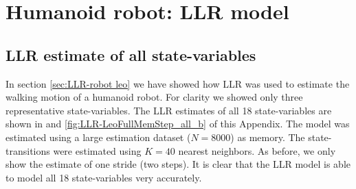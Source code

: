 \chapter{Humanoid robot: LLR model}\label{app:LeoWalking}

\section{LLR estimate of all state-variables}

In section \ref{sec:LLR-robot leo} we have showed how \ac{LLR} was used to estimate the walking motion of a humanoid robot. For clarity we showed only three representative state-variables. The \ac{LLR} estimates of all 18 state-variables are shown in  and \ref {fig:LLR-LeoFullMemStep_all_b} of this Appendix. The model was estimated using a large estimation dataset ($N=8000$) as memory. The state-transitions were estimated using $K=40$ nearest neighbors. As before, we only show the estimate of one stride (two steps). It is clear that the \ac{LLR} model is able to model all 18 state-variables very accurately. 

